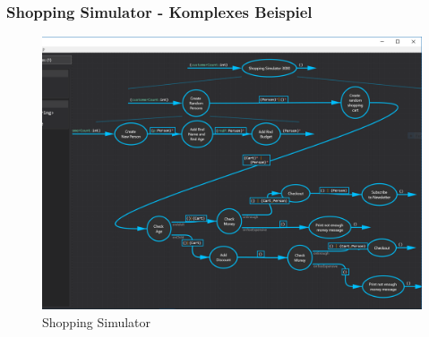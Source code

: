 \subsubsection{Shopping Simulator - Komplexes Beispiel}
\begin{figure}[H]
	\centering
	\includegraphics[width=1.1\linewidth]{../Screenshots/Dexel_v03.png}
	\caption{Shopping Simulator}
\end{figure}

